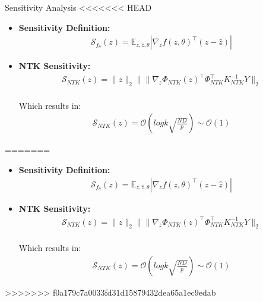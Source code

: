 \documentclass[serif, aspectratio=169]{beamer}
\begin{document}
\begin{frame}{Sensitivity Analysis}
<<<<<<< HEAD
	\begin{itemize}
		\item \textbf{Sensitivity Definition:}
		\begin{align*}                
			\mathcal{S}_{f_{\theta}}(z) = \mathbb{E}_{z, \hat{z}, \theta} | \nabla_{z} f(z, \theta)^{\top} (z - \hat{z}) |
		\end{align*}
		\item \textbf{NTK Sensitivity:}
		\begin{align*}
			\mathcal{S}_{NTK}(z) = \|z\|_{2} \| \| \nabla_{z} \Phi_{NTK}(z)^{\top} \Phi_{NTK}^{\top} K_{NTK}^{-1} Y \|_{2}
		\end{align*}\\
		Which results in:
		\begin{align*}
			\mathcal{S}_{NTK}(z) = \mathcal{O}\left(log k \sqrt{\frac{ND}{p}}\right) \sim \mathcal{O}(1)
		\end{align*}
	\end{itemize}
=======
    \begin{itemize}
        \item \textbf{Sensitivity Definition:}
            \begin{align*}                
                \mathcal{S}_{f_{\theta}}(z) = \mathbb{E}_{z, \hat{z}, \theta} | \nabla_{z} f(z, \theta)^{\top} (z - \hat{z}) |
            \end{align*}
        \item \textbf{NTK Sensitivity:}
        \begin{align*}
            \mathcal{S}_{NTK}(z) = \|z\|_{2} \| \| \nabla_{z} \Phi_{NTK}(z)^{\top} \Phi_{NTK}^{\top} K_{NTK}^{-1} Y \|_{2}
        \end{align*}\\
        Which results in:
        \begin{align*}
            \mathcal{S}_{NTK}(z) = \mathcal{O}\left(log k \sqrt{\frac{ND}{p}}\right) \sim \mathcal{O}(1)
        \end{align*}
    \end{itemize}
>>>>>>> f0a179c7a0033fd31d15879432dea65a1ec9edab
\end{frame}
\end{document}
